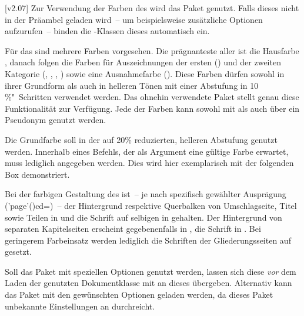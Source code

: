 \begin{DeclareEntity}{}
[v2.07]
Zur Verwendung der Farben des \CDs wird das Paket  
genutzt. Falls dieses nicht in der Präambel geladen wird~-- um beispielsweise 
zusätzliche Optionen aufzurufen~-- binden die \TUDScript-Klassen dieses 
automatisch ein.

Für das \CD sind mehrere Farben vorgesehen. Die prägnanteste aller ist die 
Hausfarbe , danach folgen die Farben für Auszeichnungen der ersten
() und der zweiten Kategorie (, , 
, ) sowie eine Ausnahmefarbe (). 
Diese Farben dürfen sowohl in ihrer Grundform als auch in helleren Tönen mit 
einer Abstufung in 10\,\%"~Schritten verwendet werden. Das ohnehin verwendete 
Paket  stellt genau diese Funktionalität zur Verfügung. Jede 
der Farben kann sowohl mit  als auch über ein Pseudonym 
 genutzt werden.
%
\begin{Example}
Die Grundfarbe  soll in der auf 20\% reduzierten, helleren 
Abstufung genutzt werden. Innerhalb eines Befehls, der als Argument eine 
gültige Farbe erwartet, muss lediglich  angegeben werden. 
Dies wird hier exemplarisch mit der folgenden \colorbox{HKS44!20}{%
  Box %
}
demonstriert.
\end{Example}
%
Bei der farbigen Gestaltung des \CDs ist~-- je nach spezifisch gewählter 
Ausprägung (\Option'page'(){cd=\PMisc})~-- der Hintergrund 
respektive Querbalken von Umschlagseite, Titel sowie Teilen in  
und die Schrift auf selbigen in  gehalten. Der 
Hintergrund von separaten Kapitelseiten erscheint gegebenenfalls in 
, die Schrift in . Bei geringerem 
Farbeinsatz werden lediglich die Schriften der Gliederungsseiten auf 
 gesetzt.

Soll das Paket  mit speziellen Optionen genutzt werden, lassen 
sich diese \emph{vor} dem Laden der genutzten Dokumentklasse mit 
 an dieses 
übergeben. Alternativ kann das Paket  mit den gewünschten 
Optionen geladen werden, da dieses Paket unbekannte Einstellungen an 
 durchreicht.




\end{DeclareEntity}
